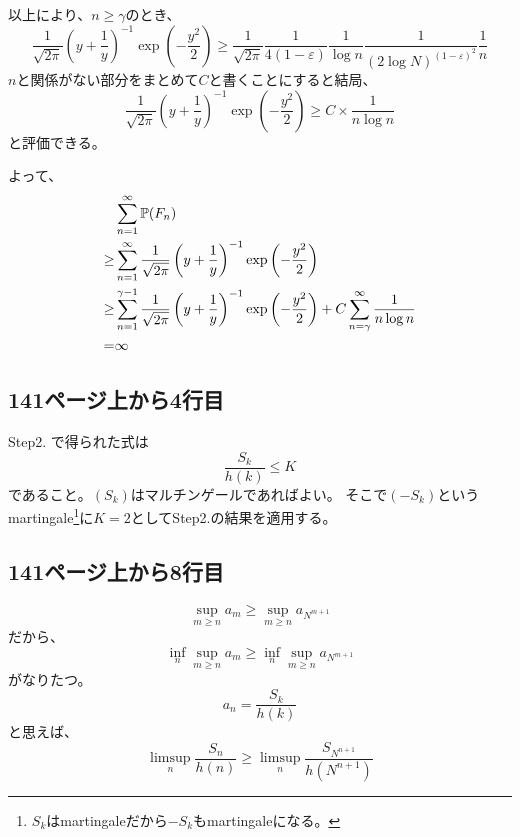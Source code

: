       以上により、$n \ge \gamma$のとき、
      \[
        \frac{1}{\sqrt{2\pi}}\left( y + \frac{1}{y} \right)^{-1}\exp\left( -\frac{y^2}{2}\right) \ge \frac{1}{\sqrt{2\pi}} \frac{1}{4(1 - \varepsilon)}  \frac{1}{\log n} \frac{1}{(2\log N)^{(1-\varepsilon)^2}}  \frac{1}{n}
      \]
      $n$と関係がない部分をまとめて$C$と書くことにすると結局、
      \[
        \frac{1}{\sqrt{2\pi}}\left( y + \frac{1}{y} \right)^{-1}\exp\left( -\frac{y^2}{2}\right) \ge C \times \frac{1}{n\log n}
      \]
      と評価できる。

      よって、
      \begin{align*}
        &\sum_{n=1}^{\infty} {\mathbb{P}}(F_n)\\
        \ge & \sum_{n=1}^{\infty} \frac{1}{\sqrt{2\pi}}\left( y + \frac{1}{y} \right)^{-1}\exp\left( -\frac{y^2}{2}\right)\\
        \ge & \sum_{n=1}^{\gamma - 1} \frac{1}{\sqrt{2\pi}}\left( y + \frac{1}{y} \right)^{-1}\exp\left( -\frac{y^2}{2}\right) + C \sum_{n=\gamma}^{\infty} \frac{1}{n\log n}\\
        = & \infty
      \end{align*}

  \subsection{141ページ上から4行目}
    Step2. で得られた式は
    \[
      \frac{S_k}{h(k)} \leq K
    \]
    であること。$(S_k)$はマルチンゲールであればよい。
    そこで$(-S_k)$というmartingale\footnote{$S_k$はmartingaleだから$-S_k$もmartingaleになる。}に$K=2$としてStep2.の結果を適用する。

  \subsection{141ページ上から8行目}
    \[
      \sup_{m \ge n}a_m \ge \sup_{m \ge n}a_{N^{m+1}}
    \]
    だから、
    \[
      \inf_{n}\sup_{m \ge n}a_m \ge \inf_{n}\sup_{m \ge n}a_{N^{m+1}}
    \]
    がなりたつ。
    \[a_n = \frac{S_k}{h(k)}\]
    と思えば、
    \[
      \limsup_n \frac{S_n}{h(n)} \ge \limsup_n \frac{S_{N^{n+1}}}{h(N^{n+1})}
    \]

